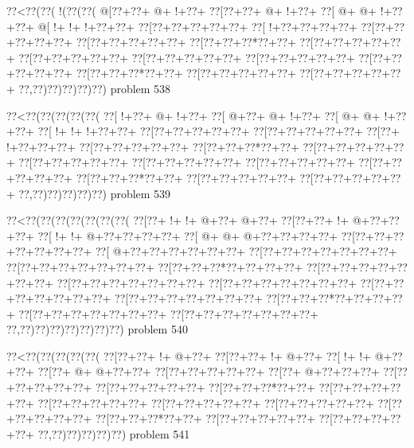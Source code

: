 \vbox{\vbox{\goo
\0??<\0??(\0??(\- !(\0??(\0??(
\- @[\0??+\0??+\- @+\- !+\0??+
\0??[\0??+\0??+\- @+\- !+\0??+
\0??[\- @+\- @+\- !+\0??+\0??+
\- @[\- !+\- !+\- !+\0??+\0??+
\0??[\0??+\0??+\0??+\0??+\0??+
\0??[\- !+\0??+\0??+\0??+\0??+
\0??[\0??+\0??+\0??+\0??+\0??+
\0??[\0??+\0??+\0??+\0??+\0??+
\0??[\0??+\0??+\0??*\0??+\0??+
\0??[\0??+\0??+\0??+\0??+\0??+
\0??[\0??+\0??+\0??+\0??+\0??+
\0??[\0??+\0??+\0??+\0??+\0??+
\0??[\0??+\0??+\0??+\0??+\0??+
\0??[\0??+\0??+\0??+\0??+\0??+
\0??[\0??+\0??+\0??*\0??+\0??+
\0??[\0??+\0??+\0??+\0??+\0??+
\0??[\0??+\0??+\0??+\0??+\0??+
\0??,\0??)\0??)\0??)\0??)\0??)
}
\hfil problem 538\hfil\break
}

\vbox{\vbox{\goo
\0??<\0??(\0??(\0??(\0??(\0??(
\0??[\- !+\0??+\- @+\- !+\0??+
\0??[\- @+\0??+\- @+\- !+\0??+
\0??[\- @+\- @+\- !+\0??+\0??+
\0??[\- !+\- !+\- !+\0??+\0??+
\0??[\0??+\0??+\0??+\0??+\0??+
\0??[\0??+\0??+\0??+\0??+\0??+
\0??[\0??+\- !+\0??+\0??+\0??+
\0??[\0??+\0??+\0??+\0??+\0??+
\0??[\0??+\0??+\0??*\0??+\0??+
\0??[\0??+\0??+\0??+\0??+\0??+
\0??[\0??+\0??+\0??+\0??+\0??+
\0??[\0??+\0??+\0??+\0??+\0??+
\0??[\0??+\0??+\0??+\0??+\0??+
\0??[\0??+\0??+\0??+\0??+\0??+
\0??[\0??+\0??+\0??*\0??+\0??+
\0??[\0??+\0??+\0??+\0??+\0??+
\0??[\0??+\0??+\0??+\0??+\0??+
\0??,\0??)\0??)\0??)\0??)\0??)
}
\hfil problem 539\hfil\break
}

\vbox{\vbox{\goo
\0??<\0??(\0??(\0??(\0??(\0??(\0??(\0??(
\0??[\0??+\- !+\- !+\- @+\0??+\- @+\0??+
\0??[\0??+\0??+\- !+\- @+\0??+\0??+\0??+
\0??[\- !+\- !+\- @+\0??+\0??+\0??+\0??+
\0??[\- @+\- @+\- @+\0??+\0??+\0??+\0??+
\0??[\0??+\0??+\0??+\0??+\0??+\0??+\0??+
\0??[\- @+\0??+\0??+\0??+\0??+\0??+\0??+
\0??[\0??+\0??+\0??+\0??+\0??+\0??+\0??+
\0??[\0??+\0??+\0??+\0??+\0??+\0??+\0??+
\0??[\0??+\0??+\0??*\0??+\0??+\0??+\0??+
\0??[\0??+\0??+\0??+\0??+\0??+\0??+\0??+
\0??[\0??+\0??+\0??+\0??+\0??+\0??+\0??+
\0??[\0??+\0??+\0??+\0??+\0??+\0??+\0??+
\0??[\0??+\0??+\0??+\0??+\0??+\0??+\0??+
\0??[\0??+\0??+\0??+\0??+\0??+\0??+\0??+
\0??[\0??+\0??+\0??*\0??+\0??+\0??+\0??+
\0??[\0??+\0??+\0??+\0??+\0??+\0??+\0??+
\0??[\0??+\0??+\0??+\0??+\0??+\0??+\0??+
\0??,\0??)\0??)\0??)\0??)\0??)\0??)\0??)
}
\hfil problem 540\hfil\break
}

\vbox{\vbox{\goo
\0??<\0??(\0??(\0??(\0??(\0??(
\0??[\0??+\0??+\- !+\- @+\0??+
\0??[\0??+\0??+\- !+\- @+\0??+
\0??[\- !+\- !+\- @+\0??+\0??+
\0??[\0??+\- @+\- @+\0??+\0??+
\0??[\0??+\0??+\0??+\0??+\0??+
\0??[\0??+\- @+\0??+\0??+\0??+
\0??[\0??+\0??+\0??+\0??+\0??+
\0??[\0??+\0??+\0??+\0??+\0??+
\0??[\0??+\0??+\0??*\0??+\0??+
\0??[\0??+\0??+\0??+\0??+\0??+
\0??[\0??+\0??+\0??+\0??+\0??+
\0??[\0??+\0??+\0??+\0??+\0??+
\0??[\0??+\0??+\0??+\0??+\0??+
\0??[\0??+\0??+\0??+\0??+\0??+
\0??[\0??+\0??+\0??*\0??+\0??+
\0??[\0??+\0??+\0??+\0??+\0??+
\0??[\0??+\0??+\0??+\0??+\0??+
\0??,\0??)\0??)\0??)\0??)\0??)
}
\hfil problem 541\hfil\break
}


